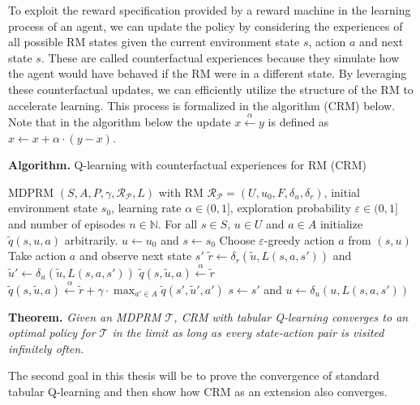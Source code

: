 \documentclass[12pt, a4paper]{article}
\newcommand{\eps}{\varepsilon}
\begin{document}
To exploit the reward specification provided by a reward machine in the learning process of an agent, we can update the policy by considering the experiences of all possible RM states given the current environment state $s$, action $a$ and next state $s$. These are called counterfactual experiences because they simulate how the agent would have behaved if the RM were in a different state. By leveraging these counterfactual updates, we can efficiently utilize the structure of the RM to accelerate learning. This process is formalized in the algorithm (CRM) below. Note that in the algorithm below the update $x \overset{\alpha}{\gets} y$ is defined as $x \gets x + \alpha \cdot (y - x)$.

\begin{algorithm}[ht!]
	\textbf{Algorithm.}
	Q-learning with counterfactual experiences for RM (CRM) \cite{RM2022}
	\begin{algorithmic}[1]
		\Require MDPRM $(S, A, P, \gamma, \mathcal{R}_\mathcal{P}, L)$ with RM $\mathcal{R}_\mathcal{P} = (U, u_0, F, \delta_u, \delta_r)$, initial environment state $s_0$, learning rate $\alpha \in (0,1]$, exploration probability $\eps \in (0, 1]$ and number of episodes $n \in \mathbb{N}$.
		\State For all $s \in S$, $u \in U$ and $a \in A$ initialize $\tilde{q}(s, u, a)$ arbitrarily.
		\State $u \gets u_0$ and $s \gets s_0$
		\State Choose $\eps$-greedy action $a$ from $(s, u)$
		\State Take action $a$ and observe next state $s'$
		\State $\tilde{r} \gets \delta_r(\tilde{u}, L(s,a,s'))$ and $\tilde{u}' \gets \delta_u(\tilde{u}, L(s,a,s'))$
		\State $\tilde{q}(s, \tilde{u}, a) \overset{\alpha}{\gets} \tilde{r}$
		\Else
		\State $\tilde{q}(s, \tilde{u}, a) \overset{\alpha}{\gets} \tilde{r} + \gamma \cdot \max_{a' \in A} \tilde{q}(s', \tilde{u}', a')$
		\EndIf
		\EndFor
		\State $s \gets s'$ and $u \gets \delta_u(u, L(s,a,s'))$
		\EndWhile
		\EndFor
	\end{algorithmic}
\end{algorithm}

\textbf{Theorem.}
\emph{Given an MDPRM $\mathcal{T}$, CRM with tabular Q-learning converges to an optimal policy for $\mathcal{T}$ in the limit as long as every state-action pair is visited infinitely often.}
\cite{RM2022}

The second goal in this thesis will be to prove the convergence of standard tabular Q-learning and then show how CRM as an extension also converges.
\end{document}
